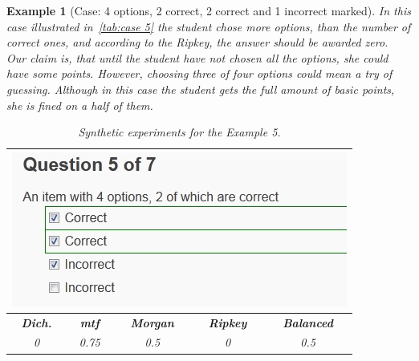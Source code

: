 \documentclass[PhD, Submit, ngerman,UKenglish,table]{scrbook}
\newtheorem{example}{Example}
\begin{document}
\begin{example}[Case: 4 options, 2 correct, 2 correct and 1 incorrect marked]
In this case illustrated in~\autoref{tab:case 5} the student chose more options, than the number of correct ones, and according to the Ripkey, the answer should be awarded zero.
Our claim is, that until the student have not chosen all the options, she could have some points.
However, choosing three of four options could mean a try of guessing.
Although in this case the student gets the full amount of \textit{basic} points, she is fined on a half of them.

\begin{table}[h!]
	\centering
	\begin{tabularx}{0.55\columnwidth}{c c c c c} 
	\toprule  
    \multicolumn{5}{c}{\includegraphics[width=0.4\columnwidth]{images/case5.jpg}}\\
    \midrule
    \textbf{Dich.}&\textbf{\gls{mtf}}&\textbf{Morgan}&\textbf{Ripkey}&\textbf{Balanced}\\
	\midrule
    0&0.75&0.5&0&0.5\\
	\bottomrule
    \end{tabularx}
	\caption{Synthetic experiments for the Example 5.}
	\label{tab:case 5}
\end{table}
\end{example}
\end{document}
